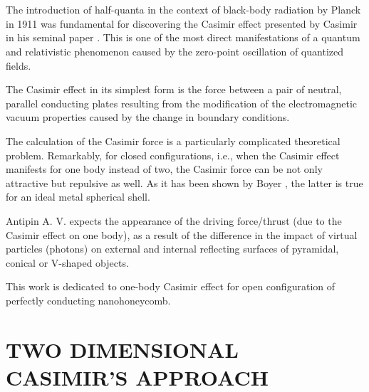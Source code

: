 \documentclass[twoside, 10pt, ptm]{article}
\begin{document}
\begin{multicols}{2}

    \section*{}\label{introduction}
\vspace{-3.5mm}

The introduction of half-quanta in the context of
black-body radiation by Planck in 1911 was fundamental for discovering the Casimir effect
presented by Casimir in his seminal paper \cite{Casimir1948}.
This is one of the most direct
manifestations of a quantum and relativistic phenomenon caused by the
zero-point oscillation of quantized fields.

The Casimir effect in its simplest form is the force between a pair of
neutral, parallel conducting plates resulting from the modification of
the electromagnetic vacuum properties caused by the change in boundary conditions.

The calculation of the Casimir force is a particularly complicated
theoretical problem. Remarkably, for closed configurations, i.e., when the
Casimir effect manifests for one body instead of two, the Casimir force can be not
only attractive but repulsive as well. As it has been shown by Boyer
\cite{Boyer1968}, the latter is true for an ideal metal spherical shell.

Antipin A. V. \cite{Antipin2012} expects the appearance of the driving force/thrust (due to the Casimir
effect on one body), as a result of the difference in the impact of virtual particles (photons) on
external and internal reflecting surfaces of pyramidal, conical or V-shaped objects.

This work is dedicated to one-body Casimir effect for open
configuration of perfectly conducting nanohoneycomb.



    \section*{\centering\uppercase{Two dimensional Casimir's
approach}}\label{two-dimensional-casimirs-approach}
\vspace{-3.5mm}


\end{multicols}
\end{document}
